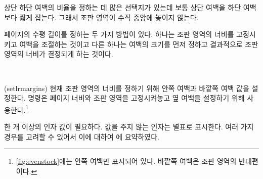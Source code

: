 상단 하단 여백의 비율을 정하는 데 많은 선택지가 있는데
보통 상단 여백을 하단 여백보다 짧게 잡는다.
그래서 조판 영역이 수직 중앙에 놓이지 않는다.

페이지의 수평 길이를 정하는 두 가지 방법이 있다.
하나는 조판 영역의 너비를 고정시키고 여백을 조절하는 것이고
다른 하나는 여백의 크기를 먼저 정하고 결과적으로 조판 영역의 너비가
결정되게 하는 것이다.

\begin{syntax}
\cmd{\setlrmargins} \\
\end{syntax}
\glossary(setlrmargins)%
  {}%
  {현재 조판 영역의 너비를 정하기 위해 안쪽 여백과 바깥쪽 여백 값을 설정한다.}
\cmd{\setlrmargins} 명령은 페이지 너비와 조판 영역을 고정시켜놓고
옆 여백을 설정하기 위해 사용한다.\footnote{\과 \ref{fig:evenstock}에는 안쪽 여백만 표시되어 있다. 바깥쪽 여백은 조판 영역의 반대편이다.}

 
한 개 이상의 인자 값이 필요하다. 값을 주지 않는 인자는 별표로 표시한다.
여러 가지 경우를 고려할 수 있어서 이에 대하여 에
요약하였다.

